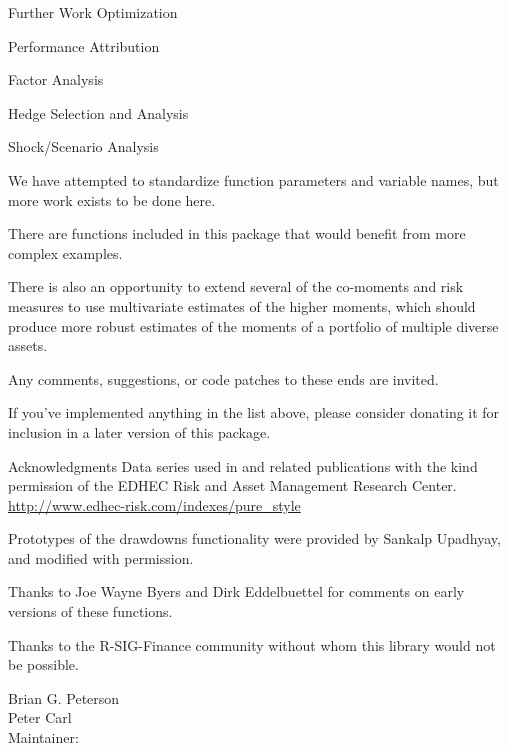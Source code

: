 \documentclass[12pt,letterpaper,english]{article}
\begin{document}
\begin{Section}{Further Work}
Optimization

Performance Attribution

Factor Analysis

Hedge Selection and Analysis

Shock/Scenario Analysis

We have attempted to standardize function parameters and variable names, but more work exists to be done here.

There are functions included in this package that would benefit from more complex examples.

There is also an opportunity to extend several of the co-moments and risk measures to use multivariate estimates of the higher moments, which should produce more robust estimates of the moments of a portfolio of multiple diverse assets.

Any comments, suggestions, or code patches to these ends are invited.

If you've implemented anything in the list above, please consider donating it for inclusion in a later version of this package.
\end{Section}
\begin{Section}{Acknowledgments}
Data series  used in  and related publications with the kind permission of the EDHEC Risk and Asset Management Research Center. \\
\url{http://www.edhec-risk.com/indexes/pure_style}

Prototypes of the drawdowns functionality were provided by Sankalp Upadhyay, and modified with permission.

Thanks to Joe Wayne Byers and Dirk Eddelbuettel for comments on early versions of these functions.

Thanks to the R-SIG-Finance community without whom this library would not be possible.
\end{Section}
\begin{Author}
Brian G. Peterson \\
Peter Carl \\
Maintainer:  
\end{Author}
\end{document}
